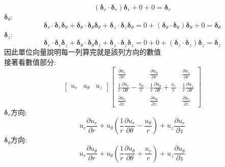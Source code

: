 \documentclass[../main.tex]{subfiles}
\begin{document}
\begin{itemize}
\begin{itemize}
\begin{enumerate}
\begin{equation}
            \left(\bm\delta_r \cdot \bm\delta_r\right)\bm\delta_r + 0 + 0 = \bm\delta_r
          \end{equation}
          $\bm \delta_\theta$:
          \begin{equation}
            \bm\delta_r \cdot \bm\delta_r\bm\delta_\theta  +  \bm\delta_\theta \cdot \bm\delta_\theta\bm\delta_\theta + \bm\delta_z \cdot \bm\delta_z\bm\delta_\theta =
            0 + \left(\bm\delta_\theta \cdot \bm\delta_\theta\right)\bm\delta_\theta + 0 = \bm\delta_\theta
          \end{equation}
          $\bm \delta_z$:
          \begin{equation}
            \bm\delta_r \cdot \bm\delta_r\bm\delta_z  +  \bm\delta_\theta \cdot \bm\delta_\theta\bm\delta_z + \bm\delta_z \cdot \bm\delta_z\bm\delta_z =
            0 + 0 + \left(\bm\delta_z \cdot \bm\delta_z\right)\bm\delta_z = \bm\delta_z
          \end{equation}
          因此單位向量說明每一列算完就是該列方向的數值\\
          接著看數值部分:
          \begin{equation}
            \begin{bmatrix}
              u_r & u_\theta & u_z
            \end{bmatrix}
            \begin{bmatrix}
              \frac{\partial u_r}{\partial r} & \frac{\partial u_\theta}{\partial r} & \frac{\partial u_z}{\partial r} \\
              \frac{1}{r}\frac{\partial u_r}{\partial\theta} - \frac{u_\theta}{r} &
              \frac{1}{r} \frac{\partial u_\theta}{\partial \theta}+\frac{u_r}{r} &
              \frac{1}{r} \frac{\partial u_z}{\partial \theta} \\
              \frac{\partial u_r}{\partial z} & \frac{\partial u_\theta}{\partial z} & \frac{\partial u_z}{\partial z}
            \end{bmatrix}
          \end{equation}
          $\bm \delta_r$方向:
          \begin{equation}
            u_r \frac{\partial u_r}{\partial r} + u_\theta \left(\frac{1}{r}\frac{\partial u_r}{\partial\theta} - \frac{u_\theta}{r}\right) + u_z \frac{\partial u_r}{\partial z}
          \end{equation}
          $\bm \delta_\theta$方向:
          \begin{equation}
            u_r \frac{\partial u_\theta}{\partial r} + u_\theta \left(\frac{1}{r} \frac{\partial u_\theta}{\partial \theta}+\frac{u_r}{r}\right) + u_z \frac{\partial u_\theta}{\partial z}

\end{equation}
\end{enumerate}
\end{itemize}
\end{itemize}
\end{document}
